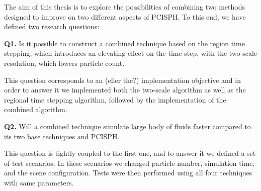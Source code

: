 \documentclass[../../main.tex]{subfiles}
\begin{document}
\tracingall


The aim of this thesis is to explore the possibilities of combining two methods designed to improve on two different aspects of PCISPH. To this end, we have defined two research questions: 

\begin{displayquote}
{\large \textbf{Q1.}} 
Is it possible to construct a combined technique based on the region time stepping, which introduces an elevating effect on the time step, with the two-scale resolution, which lowers particle count.
\end{displayquote} 

This question corresponds to an (eller the?) implementation objective and in order to answer it we implemented both the two-scale algorithm as well as the regional time stepping algorithm, followed by the implementation of the combined algorithm. 

\begin{displayquote}
{\large \textbf{Q2.}} Will a combined technique simulate large body of fluids faster compared to its two base techniques and PCISPH.
\end{displayquote}

This question is tightly coupled to the first one, and to answer it we defined a set of test scenarios. In these scenarios we changed particle number, simulation time, and the scene configuration. Tests were then performed using all four techniques with same parameters. 
\end{document}
